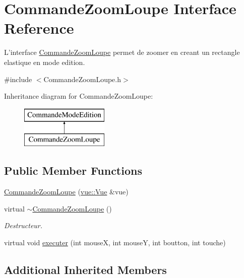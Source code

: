 \hypertarget{class_commande_zoom_loupe}{\section{Commande\-Zoom\-Loupe Interface Reference}
\label{class_commande_zoom_loupe}
}


L'interface \hyperlink{class_commande_zoom_loupe}{Commande\-Zoom\-Loupe} permet de zoomer en creant un rectangle elastique en mode edition.  




{\ttfamily \#include $<$Commande\-Zoom\-Loupe.\-h$>$}

Inheritance diagram for Commande\-Zoom\-Loupe\-:\begin{figure}[H]
\begin{center}
\leavevmode
\includegraphics[height=2.000000cm]{class_commande_zoom_loupe}
\end{center}
\end{figure}
\subsection*{Public Member Functions}
\begin{DoxyCompactItemize}
\item 
\hyperlink{group__inf2990_gaef25c554211f1d059d0e0da604bba314}{Commande\-Zoom\-Loupe} (\hyperlink{classvue_1_1_vue}{vue\-::\-Vue} \&vue)
\item 
\hypertarget{class_commande_zoom_loupe_a4903ef37ed8f806a3cd2b42ee5e41c1a}{virtual \hyperlink{class_commande_zoom_loupe_a4903ef37ed8f806a3cd2b42ee5e41c1a}{$\sim$\-Commande\-Zoom\-Loupe} ()}\label{class_commande_zoom_loupe_a4903ef37ed8f806a3cd2b42ee5e41c1a}

\begin{DoxyCompactList}\small\item\em Destructeur. \end{DoxyCompactList}\item 
virtual void \hyperlink{group__inf2990_ga803d538d34b6d32dd88def5126d0684b}{executer} (int mouse\-X, int mouse\-Y, int boutton, int touche)
\end{DoxyCompactItemize}
\subsection*{Additional Inherited Members}


